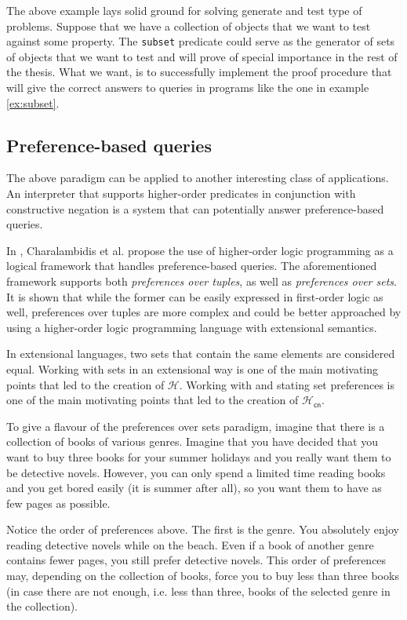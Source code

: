 \documentclass[inscr,ack,preface]{dithesis}
\theoremstyle{definition}
\newcommand{\h}{$\mathcal{H}$}
\newcommand{\hcn}{$\mathcal{H}_\mathsf{cn}$}
\begin{document}
The above example lays solid ground for solving generate and test type of problems. Suppose that we have a collection of objects that we want to test against some property. The \texttt{subset} predicate could serve as the generator of sets of objects that we want to test and will prove of special importance in the rest of the thesis. What we want, is to successfully implement the proof procedure that will give the correct answers to queries in programs like the one in example \ref{ex:subset}.

\subsection*{Preference-based queries}
The above paradigm can be applied to another interesting class of applications. An interpreter that supports higher-order predicates in conjunction with constructive negation is a system that can potentially answer preference-based queries.

In \cite{DBLP:conf/ppdp/CharalambidisRT16}, Charalambidis et al. propose the use of higher-order logic programming as a logical framework that handles preference-based queries. The aforementioned framework supports both \emph{preferences over tuples}, as well as \emph{preferences over sets}. It is shown that while the former can be easily expressed in first-order logic as well, preferences over tuples are more complex and could be better approached by using a higher-order logic programming language with extensional semantics.

In extensional languages, two sets that contain the same elements are considered equal. Working with sets in an extensional way is one of the main motivating points that led to the creation of \h{}. Working with and stating set preferences is one of the main motivating points that led to the creation of \hcn{}.

To give a flavour of the preferences over sets paradigm, imagine that there is a collection of books of various genres. Imagine that you have decided that you want to buy three books for your summer holidays and you really want them to be detective novels. However, you can only spend a limited time reading books and you get bored easily (it is summer after all), so you want them to have as few pages as possible.

Notice the order of preferences above. The first is the genre. You absolutely enjoy reading detective novels while on the beach. Even if a book of another genre contains fewer pages, you still prefer detective novels. This order of preferences may, depending on the collection of books, force you to buy less than three books (in case there are not enough, i.e. less than three, books of the selected genre in the collection).
\end{document}
